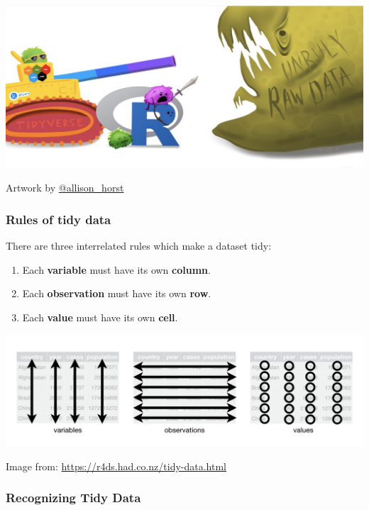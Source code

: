 \documentclass[
  openany]{book}
\providecommand{\tightlist}{%
  \setlength{\itemsep}{0pt}\setlength{\parskip}{0pt}}
\begin{document}
\begin{center}\includegraphics[width=0.7\linewidth]{images/m2/unruly} \end{center}

Artwork by \href{https://twitter.com/allison_horst}{@allison\_horst}

\hypertarget{rules-of-tidy-data}{%
\subsubsection{Rules of tidy data}\label{rules-of-tidy-data}}

There are three interrelated rules which make a dataset tidy:

\begin{enumerate}
\def\labelenumi{\arabic{enumi}.}
\tightlist
\item
  Each \textbf{variable} must have its own \textbf{column}.
\item
  Each \textbf{observation} must have its own \textbf{row}.
\item
  Each \textbf{value} must have its own \textbf{cell}.
\end{enumerate}

\begin{center}\includegraphics[width=0.7\linewidth]{images/m2/image_tidyData} \end{center}

Image from: \url{https://r4ds.had.co.nz/tidy-data.html}

\hypertarget{recognizing-tidy-data}{%
\subsubsection{Recognizing Tidy Data}\label{recognizing-tidy-data}}
\end{document}
